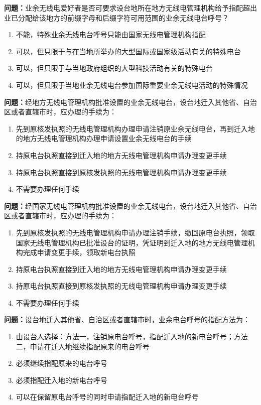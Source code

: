 \bigskip


\noindent\textbf{问题：}业余无线电爱好者是否可要求设台地所在地方无线电管理机构给予指配超出业已分配给该地方的前缀字母和后缀字符可用范围的业余无线电台呼号？
\begin{enumerate}[label=\Alph*), leftmargin=3em]
\item 不能，特殊业余无线电台呼号只能由国家无线电管理机构指配
\item 可以，但只限于与在当地所举办的大型国际或国家级活动有关的特殊电台
\item 可以，但只限于与当地政府组织的大型科技活动有关的特殊电台
\item 可以，但只限于当地业余无线电台参加国际重要业余无线电活动的特殊情况
\end{enumerate}

\bigskip


\noindent\textbf{问题：}经地方无线电管理机构批准设置的业余无线电台，设台地迁入其他省、自治区或者直辖市时，应办理的手续为：
\begin{enumerate}[label=\Alph*), leftmargin=3em]
\item 先到原核发执照的无线电管理机构办理申请注销原业余无线电台，再到迁入地的地方无线电管理机构办理申请设置业余无线电台的手续
\item 持原电台执照直接到迁入地的地方无线电管理机构申请办理变更手续
\item 持原电台执照直接到原核发执照的无线电管理机构申请办理变更手续
\item 不需要办理任何手续
\end{enumerate}

\bigskip


\noindent\textbf{问题：}经国家无线电管理机构批准设置的业余无线电台，设台地迁入其他省、自治区或者直辖市时，应办理的手续为：
\begin{enumerate}[label=\Alph*), leftmargin=3em]
\item 先到原核发执照的无线电管理机构申请办理注销手续，缴回原电台执照，领取国家无线电管理机构已批准设台的证明，凭证明到迁入地的地方无线电管理机构完成申请变更手续，领取新电台执照
\item 持原电台执照直接到迁入地的地方无线电管理机构申请办理变更手续
\item 持原电台执照直接到原核发执照的无线电管理机构申请办理变更手续
\item 不需要办理任何手续
\end{enumerate}

\bigskip


\noindent\textbf{问题：}设台地迁入其他省、自治区或者直辖市时，业余电台呼号的指配方法为：
\begin{enumerate}[label=\Alph*), leftmargin=3em]
\item 由设台人选择：方法一，注销原电台呼号，指配迁入地的新电台呼号；方法二，申请在迁入地继续指配原来的电台呼号
\item 必须继续指配原来的电台呼号
\item 必须指配迁入地的新电台呼号
\item 可以在保留原电台呼号的同时申请指配迁入地的新电台呼号
\end{enumerate}

